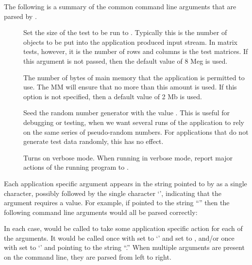 The following is a summary of the common command line arguments that
are parsed by .
\begin{description}
\item[]
Set the size of the test to be run to .  Typically this
is the number of objects to be put into the application produced input
stream.  In matrix tests, however, it is the number of rows and
columns is the test matrices.  If this argument is not passed, then
the default value of 8 Meg is used.
\item[]
The number of bytes of main memory that the application is permitted to
use.  The MM will ensure that no more than this amount is
used.  If this option is not specified, then a default value of 2 Mb
is used.
\item[]
Seed the random number generator with the value .
This is useful for debugging or testing, when we want several runs of
the application to rely on the same series of pseudo-random numbers.
For applications that do not generate test data randomly, this has no
effect. 
\item[]
Turns on verbose mode.  When running in verbose mode, report major
actions of the running program to .
\end{description}

Each application specific argument appears in the string pointed to by
 as a single character, possibly followed by the single
character `\myverb{:}', indicating that the argument requires a value.
For example, if  pointed to the string ``'' then the
following command line arguments would all be parsed correctly:
\begin{description}
\item[]
\item[]
\item[]
\item[]
\item[]
\end{description}
In each case,  would be called to take some
application specific action for each of the arguments.  It would be
called once with  set to `' and  set to
, and/or once with  set to `' and
 pointing to the string ``.''  When multiple arguments
are present on the command line, they are parsed from left to right.


